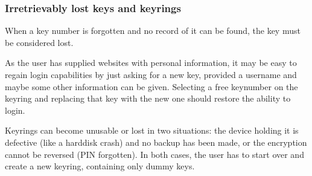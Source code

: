 \subsubsection{Irretrievably lost keys and keyrings}
When a key number is forgotten and no record of it can be found,
the key must be considered lost.
\par
As the user has supplied websites with personal information,
it may be easy to regain login capabilities by just asking for a new key,
provided a username and maybe some other information can be given.
Selecting a free keynumber on the keyring and replacing that key with the new one should restore the ability to login.
\par
Keyrings can become unusable or lost in two situations:
the device holding it is defective (like a harddisk crash) and no backup has been made,
or the encryption cannot be reversed (PIN forgotten).
In both cases, the user has to start over and create a new keyring, containing only dummy keys.
